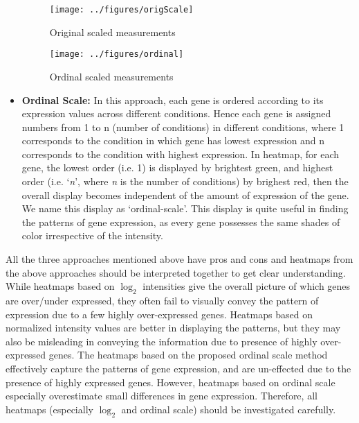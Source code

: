 \documentclass[12pt, oneside, letterpaper]{article}
\begin{document}
\begin{itemize}
\begin{figure*}[p]
\begin{minipage}[t]{2.5in}
\centering
\texttt{[image: ../figures/origScale]}
\caption{Original scaled measurements}
\label{Original scaled intensities}
\end{minipage}
\hfill
\begin{minipage}[t]{2.5in}
\centering
\texttt{[image: ../figures/ordinal]}
\caption{Ordinal scaled measurements}
\label{Ordinal scaled intensities}
\end{minipage}
\end{figure*}

\item \textbf{Ordinal Scale:}
	In this approach, each gene is ordered according to its
	expression values across different conditions. Hence each
	gene is assigned numbers from 1 to n (number of conditions)
	in different conditions, where 1 corresponds to the
	condition in which gene has lowest expression and n
	corresponds to the condition with highest expression. In
	heatmap, for each gene, the lowest order (i.e. 1) is
	displayed by brightest green, and highest order
	(i.e. `\textit{n}', where \textit{n} is the number of
	conditions) by brighest red, then the overall display
	becomes independent of the amount of expression of the gene.
	We name this display as `ordinal-scale'. This display is
	quite useful in finding the patterns of gene expression, as
	every gene possesses the same shades of color irrespective
	of the intensity.

\end{itemize}


	All the three approaches mentioned above have pros and cons
	and heatmaps from the above approaches should be interpreted
	together to get clear understanding.  While heatmaps based
	on $\log_2$ intensities give the overall picture of which
	genes are over/under expressed, they often fail to visually
	convey the pattern of expression due to a few highly
	over-expressed genes. Heatmaps based on normalized intensity
	values are better in displaying the patterns, but they may
	also be misleading in conveying the information due to
	presence of highly over-expressed genes.  The heatmaps based
	on the proposed ordinal scale method effectively capture the
	patterns of gene expression, and are un-effected due to the
	presence of highly expressed genes. However, heatmaps based
	on ordinal scale especially overestimate small differences
	in gene expression.  Therefore, all heatmaps (especially
	$\log_2$ and ordinal scale) should be investigated
	carefully.
\end{document}
